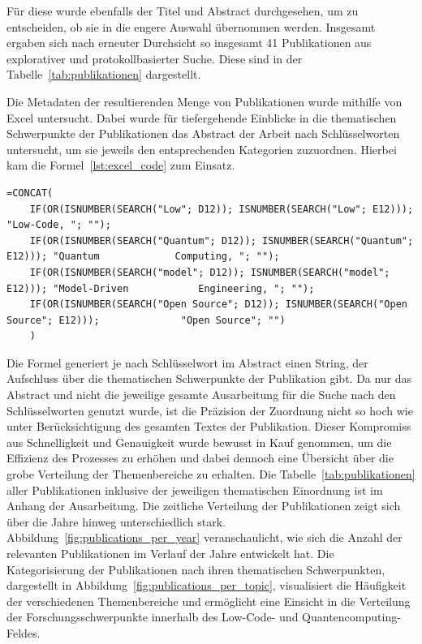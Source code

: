 Für diese wurde ebenfalls der Titel und Abstract durchgesehen, um zu entscheiden, ob sie in die engere Auswahl übernommen werden. 
Insgesamt ergaben sich nach erneuter Durchsicht so insgesamt 41 Publikationen aus explorativer und protokollbasierter Suche. 
Diese sind in der Tabelle~\ref{tab:publikationen} dargestellt. 

Die Metadaten der resultierenden Menge von Publikationen wurde mithilfe von Excel untersucht. Dabei wurde für tiefergehende Einblicke in die 
thematischen Schwerpunkte der Publikationen das Abstract der Arbeit nach Schlüsselworten untersucht, um sie jeweils den entsprechenden 
Kategorien zuzuordnen. Hierbei kam die Formel~\ref{lst:excel_code} zum Einsatz.
\begin{lstlisting}[caption=Excel Formel zur Suche von Worten im Abstract, label=lst:excel_code]
=CONCAT(
    IF(OR(ISNUMBER(SEARCH("Low"; D12)); ISNUMBER(SEARCH("Low"; E12))); "Low-Code, "; "");
    IF(OR(ISNUMBER(SEARCH("Quantum"; D12)); ISNUMBER(SEARCH("Quantum"; E12))); "Quantum             Computing, "; "");
    IF(OR(ISNUMBER(SEARCH("model"; D12)); ISNUMBER(SEARCH("model"; E12))); "Model-Driven            Engineering, "; "");
    IF(OR(ISNUMBER(SEARCH("Open Source"; D12)); ISNUMBER(SEARCH("Open Source"; E12)));              "Open Source"; "")
    )
\end{lstlisting}
Die Formel generiert je nach Schlüsselwort im Abstract einen String, der Aufschluss über die thematischen Schwerpunkte der Publikation gibt. 
Da nur das Abstract und nicht die jeweilige gesamte Ausarbeitung für die Suche nach den Schlüsselworten genutzt wurde, ist die Präzision der Zuordnung 
nicht so hoch wie unter Berücksichtigung des gesamten Textes der Publikation. Dieser Kompromiss aus Schnelligkeit und Genauigkeit wurde bewusst in 
Kauf genommen, um die Effizienz des Prozesses zu erhöhen und dabei dennoch eine Übersicht über die grobe Verteilung der Themenbereiche zu erhalten. 
Die Tabelle~\ref{tab:publikationen} aller Publikationen inklusive der jeweiligen thematischen Einordnung ist im Anhang der Ausarbeitung. 
Die zeitliche Verteilung der Publikationen zeigt sich über die Jahre hinweg unterschiedlich stark. Abbildung~\ref{fig:publications_per_year} 
veranschaulicht, wie sich die Anzahl der relevanten Publikationen im Verlauf der Jahre entwickelt hat. 
Die Kategorisierung der Publikationen nach ihren thematischen Schwerpunkten, dargestellt in Abbildung~\ref{fig:publications_per_topic}, 
visualisiert die Häufigkeit der verschiedenen Themenbereiche und ermöglicht eine Einsicht in die Verteilung der 
Forschungsschwerpunkte innerhalb des Low-Code- und Quantencomputing-Feldes. 

